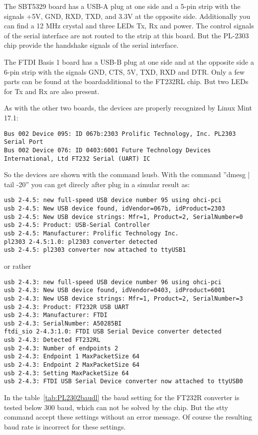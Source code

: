 The SBT5329 board has a USB-A plug at one side and a 5-pin strip with the signals
+5V, GND, RXD, TXD, and 3.3V at the opposite side.
Additionally you can find a 12 MHz crystal and three LEDs Tx, Rx and power.
The control signals of the serial interface are not routed to the strip at this board.
But the PL-2303 chip provide the handshake signals of the serial interface.

The FTDI Basis 1 board has a USB-B plug at one side and at the opposite side a
6-pin strip with the signals GND, CTS, 5V, TXD, RXD and DTR. 
Only a few parts can be found at the boardadditional to the FT232RL chip.
But two LEDs for Tx and Rx are also present.

As with the other two boards, the devices are properly recognized by Linux Mint 17.1:
\begin{verbatim}
Bus 002 Device 095: ID 067b:2303 Prolific Technology, Inc. PL2303 Serial Port
Bus 002 Device 076: ID 0403:6001 Future Technology Devices International, Ltd FT232 Serial (UART) IC
\end{verbatim}
So the devices are shown with the command lsusb.
With the command ''dmesg | tail -20'' you can get direcly after plug in a
simular result as:
\begin{verbatim}
usb 2-4.5: new full-speed USB device number 95 using ohci-pci
usb 2-4.5: New USB device found, idVendor=067b, idProduct=2303
usb 2-4.5: New USB device strings: Mfr=1, Product=2, SerialNumber=0
usb 2-4.5: Product: USB-Serial Controller
usb 2-4.5: Manufacturer: Prolific Technology Inc.
pl2303 2-4.5:1.0: pl2303 converter detected
usb 2-4.5: pl2303 converter now attached to ttyUSB1
\end{verbatim}
or rather
\begin{verbatim}
usb 2-4.3: new full-speed USB device number 96 using ohci-pci
usb 2-4.3: New USB device found, idVendor=0403, idProduct=6001
usb 2-4.3: New USB device strings: Mfr=1, Product=2, SerialNumber=3
usb 2-4.3: Product: FT232R USB UART
usb 2-4.3: Manufacturer: FTDI
usb 2-4.3: SerialNumber: A50285BI
ftdi_sio 2-4.3:1.0: FTDI USB Serial Device converter detected
usb 2-4.3: Detected FT232RL
usb 2-4.3: Number of endpoints 2
usb 2-4.3: Endpoint 1 MaxPacketSize 64
usb 2-4.3: Endpoint 2 MaxPacketSize 64
usb 2-4.3: Setting MaxPacketSize 64
usb 2-4.3: FTDI USB Serial Device converter now attached to ttyUSB0
\end{verbatim}

In the table~\ref{tab:PL2302baudl} the baud setting for the FT232R converter 
is tested below 300 baud, which can not be solved by the chip.
But the stty command accept these settings without an error message.
Of course the resulting baud rate is incorrect for these settings.

